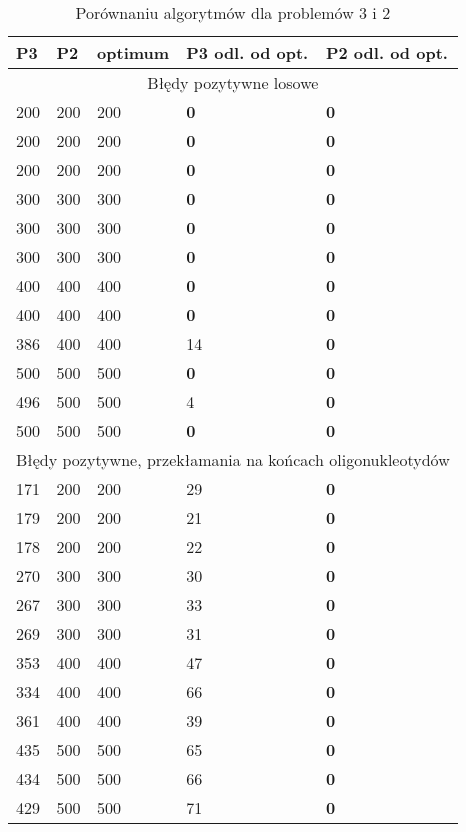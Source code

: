 \documentclass[a4paper]{article}
\begin{document}
\begin{table}[H]
\caption{Porównaniu algorytmów dla problemów 3 i 2}
\begin{tabular}{|p{2cm}|p{2cm}|p{2cm}|p{2cm}|p{2cm}|}
\hline
\multicolumn{1}{|l|}{P3} & \multicolumn{1}{l|}{P2} &
\multicolumn{1}{l|}{optimum} & \multicolumn{1}{l|}{P3 odl. od opt.} &
\multicolumn{1}{l|}{P2 odl. od opt.} \\ \hline
\multicolumn{5}{|c|}{Błędy pozytywne losowe} \\ \hline
200 & 200 & 200 & \textbf{0} & \textbf{0} \\ \hline
200 & 200 & 200 & \textbf{0} & \textbf{0} \\ \hline
200 & 200 & 200 & \textbf{0} & \textbf{0} \\ \hline
300 & 300 & 300 & \textbf{0} & \textbf{0} \\ \hline
300 & 300 & 300 & \textbf{0} & \textbf{0} \\ \hline
300 & 300 & 300 & \textbf{0} & \textbf{0} \\ \hline
400 & 400 & 400 & \textbf{0} & \textbf{0} \\ \hline
400 & 400 & 400 & \textbf{0} & \textbf{0} \\ \hline
386 & 400 & 400 & 14 & \textbf{0} \\ \hline
500 & 500 & 500 & \textbf{0} & \textbf{0} \\ \hline
496 & 500 & 500 & 4 & \textbf{0} \\ \hline
500 & 500 & 500 & \textbf{0} & \textbf{0} \\ \hline
\multicolumn{5}{|c|}{Błędy pozytywne, przekłamania na
końcach oligonukleotydów} \\ \hline
171 & 200 & 200 & 29 & \textbf{0} \\ \hline
179 & 200 & 200 & 21 & \textbf{0} \\ \hline
178 & 200 & 200 & 22 & \textbf{0} \\ \hline
270 & 300 & 300 & 30 & \textbf{0} \\ \hline
267 & 300 & 300 & 33 & \textbf{0} \\ \hline
269 & 300 & 300 & 31 & \textbf{0} \\ \hline
353 & 400 & 400 & 47 & \textbf{0} \\ \hline
334 & 400 & 400 & 66 & \textbf{0} \\ \hline
361 & 400 & 400 & 39 & \textbf{0} \\ \hline
435 & 500 & 500 & 65 & \textbf{0} \\ \hline
434 & 500 & 500 & 66 & \textbf{0} \\ \hline
429 & 500 & 500 & 71 & \textbf{0} \\ \hline
\end{tabular}
\label{}
\end{table}
\end{document}
